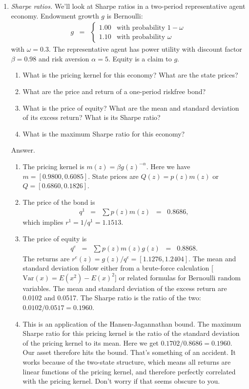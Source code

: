 \documentclass[11pt]{article}
\begin{document}
\begin{enumerate}
\item {\it Sharpe ratios.\/}
We'll look at Sharpe ratios in a two-period representative agent economy.
Endowment growth $g$ is Bernoulli:
\begin{eqnarray*}
    g &=&
        \left\{
        \begin{array}{ll}
            1.00    &  \mbox{with probability } 1-\omega \\
            1.10    &  \mbox{with probability } \omega
        \end{array}
        \right.
\end{eqnarray*}
with $\omega = 0.3$.
The representative agent has power utility with discount factor $\beta = 0.98$
and risk aversion $\alpha = 5$.
Equity is a claim to $g$.
%
\begin{enumerate}
\item What is the pricing kernel for this economy?
What are the state prices?
\item What are the price and return of a one-period riskfree bond?
\item What is the price of equity?
What are the mean and standard deviation of its excess return?
What is its Sharpe ratio?
\item What is the maximum Sharpe ratio for this economy?
\end{enumerate}
%
Answer.
\begin{enumerate}
\item The pricing kernel is $m(z) = \beta g(z)^{-\alpha} $.
Here we have $ m = [0.9800, 0.6085] $.
State prices are $Q(z) = p(z) m(z) $ or
$ Q = [ 0.6860, 0.1826]$.
\item The price of the bond is
\begin{eqnarray*}
    q^1 &=& \sum p(z) m(z) \;\;=\;\; 0.8686,
\end{eqnarray*}
which implies $r^1 = 1/q^1 = 1.1513$.
\item The price of equity is
\begin{eqnarray*}
    q^e &=& \sum p(z) m(z) g(z) \;\;=\;\; 0.8868 .
\end{eqnarray*}
The returns are $r^e(z) = g(z)/q^e =  [1.1276, 1.2404]$.
The mean and standard deviation follow either from
a brute-force calculation [$ \mbox{Var}(x) = E(x^2) - E(x)^2$]
or related formulas for Bernoulli random variables.
The mean and standard deviation of the excess return are
0.0102 and 0.0517.
The Sharpe ratio is the ratio of the two:  $0.0102/0.0517 = 0.1960$.
\item This is an application of the Hansen-Jagannathan bound.
The maximum Sharpe ratio for this pricing kernel is the ratio
of the standard deviation of the pricing kernel to its mean.
Here we get $0.1702/0.8686 = 0.1960$.
Our asset therefore hits the bound.
That's something of an accident.
It works because of the two-state structure,
which means all returns are linear functions of the pricing kernel,
and therefore perfectly correlated with the pricing kernel.
Don't worry if that seems obscure to you.
\end{enumerate}


\end{enumerate}
\end{document}
